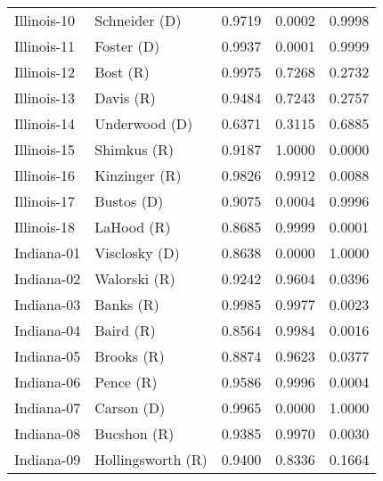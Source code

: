 \begin{longtable}{llrll}
       Illinois-10 &        {\color{Blue} Schneider (D)} &       0.9719 &        0.0002 &        0.9998 \\
       Illinois-11 &           {\color{Blue} Foster (D)} &       0.9937 &        0.0001 &        0.9999 \\
       Illinois-12 &              {\color{Red} Bost (R)} &       0.9975 &        0.7268 &        0.2732 \\
       Illinois-13 &             {\color{Red} Davis (R)} &       0.9484 &        0.7243 &        0.2757 \\
       Illinois-14 &        {\color{Blue} Underwood (D)} &       0.6371 &        0.3115 &        0.6885 \\
       Illinois-15 &           {\color{Red} Shimkus (R)} &       0.9187 &        1.0000 &        0.0000 \\
       Illinois-16 &         {\color{Red} Kinzinger (R)} &       0.9826 &        0.9912 &        0.0088 \\
       Illinois-17 &           {\color{Blue} Bustos (D)} &       0.9075 &        0.0004 &        0.9996 \\
       Illinois-18 &            {\color{Red} LaHood (R)} &       0.8685 &        0.9999 &        0.0001 \\
        Indiana-01 &        {\color{Blue} Visclosky (D)} &       0.8638 &        0.0000 &        1.0000 \\
        Indiana-02 &          {\color{Red} Walorski (R)} &       0.9242 &        0.9604 &        0.0396 \\
        Indiana-03 &             {\color{Red} Banks (R)} &       0.9985 &        0.9977 &        0.0023 \\
        Indiana-04 &             {\color{Red} Baird (R)} &       0.8564 &        0.9984 &        0.0016 \\
        Indiana-05 &            {\color{Red} Brooks (R)} &       0.8874 &        0.9623 &        0.0377 \\
        Indiana-06 &             {\color{Red} Pence (R)} &       0.9586 &        0.9996 &        0.0004 \\
        Indiana-07 &           {\color{Blue} Carson (D)} &       0.9965 &        0.0000 &        1.0000 \\
        Indiana-08 &           {\color{Red} Bucshon (R)} &       0.9385 &        0.9970 &        0.0030 \\
        Indiana-09 &     {\color{Red} Hollingsworth (R)} &       0.9400 &        0.8336 &        0.1664 \\

\end{longtable}
